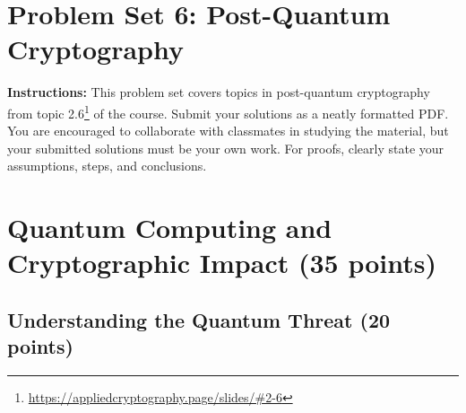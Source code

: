 \documentclass[10pt,a4paper,american]{article}
\begin{document}
\classhandoutheader

\section*{Problem Set 6: Post-Quantum Cryptography}

\begin{tcolorbox}[colframe=OliveGreen!30!white,colback=OliveGreen!5!white]
	\textbf{Instructions:} This problem set covers topics in post-quantum cryptography from topic 2.6\footnote{\url{https://appliedcryptography.page/slides/\#2-6}} of the course. Submit your solutions as a neatly formatted PDF. You are encouraged to collaborate with classmates in studying the material, but your submitted solutions must be your own work. For proofs, clearly state your assumptions, steps, and conclusions.
\end{tcolorbox}

\section{Quantum Computing and Cryptographic Impact (35 points)}

\subsection{Understanding the Quantum Threat (20 points)}
\end{document}
